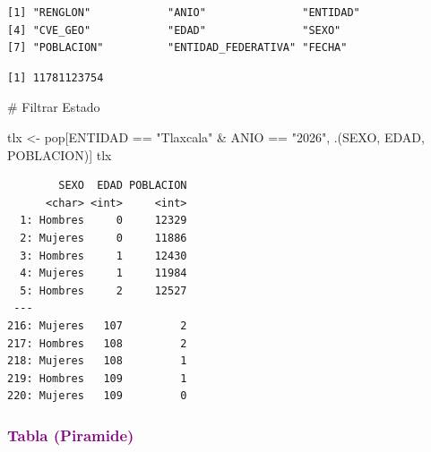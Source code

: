 \documentclass[
  letterpaper,
  DIV=11,
  numbers=noendperiod]{scrartcl}
\newenvironment{Shaded}{\begin{snugshade}}{\end{snugshade}}
\newcommand{\CommentTok}[1]{\textcolor[rgb]{0.37,0.37,0.37}{#1}}
\newcommand{\FunctionTok}[1]{\textcolor[rgb]{0.28,0.35,0.67}{#1}}
\newcommand{\NormalTok}[1]{\textcolor[rgb]{0.00,0.23,0.31}{#1}}
\newcommand{\OtherTok}[1]{\textcolor[rgb]{0.00,0.23,0.31}{#1}}
\newcommand{\SpecialCharTok}[1]{\textcolor[rgb]{0.37,0.37,0.37}{#1}}
\newcommand{\StringTok}[1]{\textcolor[rgb]{0.13,0.47,0.30}{#1}}
\begin{document}
\begin{verbatim}
[1] "RENGLON"            "ANIO"               "ENTIDAD"           
[4] "CVE_GEO"            "EDAD"               "SEXO"              
[7] "POBLACION"          "ENTIDAD_FEDERATIVA" "FECHA"             
\end{verbatim}

\begin{Shaded}
\end{Shaded}

\begin{verbatim}
[1] 11781123754
\end{verbatim}

\begin{Shaded}
\begin{Highlighting}[]
\CommentTok{\# Filtrar Estado}

\NormalTok{tlx }\OtherTok{\textless{}{-}}\NormalTok{ pop[ENTIDAD }\SpecialCharTok{==} \StringTok{"Tlaxcala"} \SpecialCharTok{\&}\NormalTok{ ANIO }\SpecialCharTok{==} \StringTok{"2026"}\NormalTok{, .(SEXO, EDAD, POBLACION)]}
\NormalTok{tlx}
\end{Highlighting}
\end{Shaded}

\begin{verbatim}
        SEXO  EDAD POBLACION
      <char> <int>     <int>
  1: Hombres     0     12329
  2: Mujeres     0     11886
  3: Hombres     1     12430
  4: Mujeres     1     11984
  5: Hombres     2     12527
 ---                        
216: Mujeres   107         2
217: Hombres   108         2
218: Mujeres   108         1
219: Hombres   109         1
220: Mujeres   109         0
\end{verbatim}

\subsubsection{\texorpdfstring{\textcolor{purple}{Tabla (Piramide)}}{}}\label{section-3}
\end{document}
